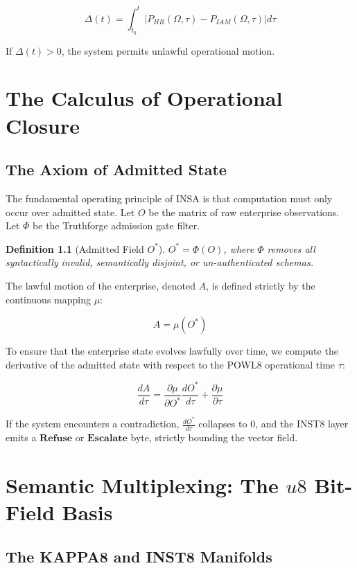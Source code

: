 \documentclass[11pt,twoside,a4paper]{book}
\newtheorem{definition}{Definition}[chapter]
\begin{document}
\begin{equation}
\Delta(t) = \int_{t_0}^{t} \left| P_{HR}(\Omega, \tau) - P_{IAM}(\Omega, \tau) \right| d\tau
\end{equation}

If $\Delta(t) > 0$, the system permits unlawful operational motion. 

\chapter{The Calculus of Operational Closure}
\section{The Axiom of Admitted State}

The fundamental operating principle of INSA is that computation must only occur over admitted state. Let $O$ be the matrix of raw enterprise observations. Let $\Phi$ be the Truthforge admission gate filter.

\begin{definition}[Admitted Field $O^*$]
$O^* = \Phi(O)$, where $\Phi$ removes all syntactically invalid, semantically disjoint, or un-authenticated schemas.
\end{definition}

The lawful motion of the enterprise, denoted $A$, is defined strictly by the continuous mapping $\mu$:

\begin{equation}
A = \mu(O^*)
\end{equation}

To ensure that the enterprise state evolves lawfully over time, we compute the derivative of the admitted state with respect to the POWL8 operational time $\tau$:

\begin{equation}
\frac{dA}{d\tau} = \frac{\partial \mu}{\partial O^*} \frac{dO^*}{d\tau} + \frac{\partial \mu}{\partial \tau}
\end{equation}

If the system encounters a contradiction, $\frac{dO^*}{d\tau}$ collapses to $0$, and the INST8 layer emits a $\mathbf{Refuse}$ or $\mathbf{Escalate}$ byte, strictly bounding the vector field.

\chapter{Semantic Multiplexing: The $u8$ Bit-Field Basis}
\section{The KAPPA8 and INST8 Manifolds}
\end{document}
